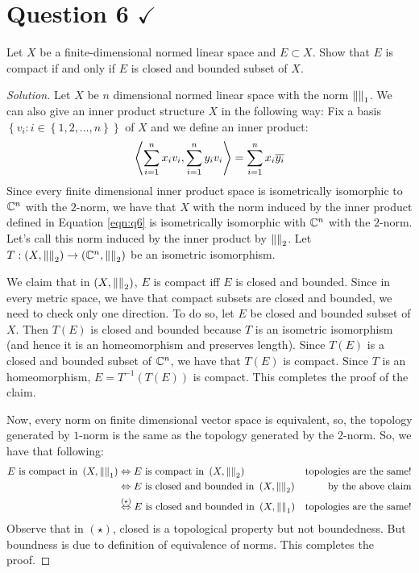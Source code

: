 \section{Question 6 \texorpdfstring{$\checkmark$}{}}
\horz
Let $X$ be a finite-dimensional normed linear space and $E\subset X$. Show that $E$ is compact if and only if $E$ is closed and bounded subset of $X.$ 
\horz

\begin{proof}[Solution]
    Let $X$ be $n$ dimensional normed linear space with the norm $\left\lVert  \right\rVert_{1}$. We can also give an inner product structure $X$ in the following way: Fix a basis $\left\{ v_{i} : i\in \left\{ 1,2,\ldots , n \right\} \right\}$ of $X$ and we define an inner product:
    \begin{equation}
	\left\langle \sum_{i=1}^{n} x_{i}v_{i}, \sum_{i=1}^{n} y_{i}v_{i} \right\rangle = \sum_{i=1}^{n} x_{i}\overline{y_{i}}	
	\label{eqn:q6}
    \end{equation}
    Since every finite dimensional inner product space is isometrically isomorphic to $\mathbb C^{n}$ with the $2$-norm, we have that $X$ with the norm induced by the inner product defined in Equation \ref{eqn:q6} is isometrically isomorphic with $\mathbb C^{n}$ with the $2$-norm. Let's call this norm induced by the inner product by $\left\lVert  \right\rVert_{2}$. Let $T: \left( X, \left\lVert  \right\rVert_{2} \right) \to \left( \mathbb C^{n} , \left\lVert  \right\rVert_{2} \right)$ be an isometric isomorphism.

    We claim that in $\left( X, \left\lVert  \right\rVert_{2} \right)$, $E$ is compact iff $E$ is closed and bounded. Since in every metric space, we have that compact subsets are closed and bounded, we need to check only one direction. To do so, let $E$ be closed and bounded subset of $X$. Then $T(E)$ is closed and bounded because $T$ is an isometric isomorphism (and hence it is an homeomorphism and preserves length). Since $T(E)$ is a closed and bounded subset of $\mathbb C ^{n}$, we have that $T\left( E \right)$ is compact. Since $T$ is an homeomorphism, $E=T^{-1} \left( T\left( E \right) \right)$ is compact. This completes the proof of the claim.

    Now, every norm on finite dimensional vector space is equivalent, so, the topology generated by $1$-norm is the same as the topology generated by the $2$-norm. So, we have that following:
    \begin{align*}
	E \text{ is compact in } \left( X, \left\lVert  \right\rVert_{1} \right) & \Leftrightarrow E \text{ is compact in } \left( X, \left\lVert  \right\rVert_{2} \right) & \text{topologies are the same!} \\
    & \Leftrightarrow E \text{ is closed and bounded in } \left( X, \left\lVert  \right\rVert_{2} \right) & \text{by the above claim} \\
& \stackrel{(\star )}{\Leftrightarrow} E \text{ is closed and bounded in } \left( X, \left\lVert  \right\rVert_{1} \right) & \text{topologies are the same!} \\
    \end{align*}
    Observe that in $\left( \star \right)$, closed is a topological property but not boundedness. But boundness is due to definition of equivalence of norms. This completes the proof.
\end{proof}
